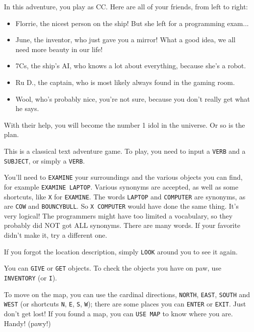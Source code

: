 \documentclass{article}
\newcommand{\bckg}[1]{\AddToShipoutPictureBG*{\texttt{[image: \#1]}}}
\begin{document}
In this adventure, you play as CC.
Here are all of your friends, from left to right:
\begin{itemize}
    \item Florrie, the nicest person on the ship! But she left for a programming exam...
    \item June, the inventor, who just gave you a mirror! What a good idea, we all need more beauty in our life!
    \item 7Cs, the ship's AI, who knows a lot about everything, because she's a robot.
    \item Ru D., the captain, who is most likely always found in the gaming room.
    \item Wool, who's probably nice, you're not sure, because you don't really get what he says.
\end{itemize}

With their help, you will become the number 1 idol in the universe. Or so is the plan.

\clearpage
{}
\bckg{img/bg}

This is a classical text adventure game.
To play, you need to input a \texttt{VERB} and a \texttt{SUBJECT}, or simply a \texttt{VERB}.

You'll need to \texttt{EXAMINE} your surroundings and the various objects you can find,
for example \texttt{EXAMINE LAPTOP}.
Various synonyms are accepted, as well as some shortcuts, like \texttt{X} for \texttt{EXAMINE}.
The words \texttt{LAPTOP} and \texttt{COMPUTER} are synonyms, as are \texttt{COW} and \texttt{BOUNCYBULL}.
So \texttt{X COMPUTER} would have done the same thing.
It's very logical!
The programmers might have too limited a vocabulary, so they probably did NOT got ALL synonyms.
There are many words. If your favorite didn't make it, try a different one.

If you forgot the location description, simply \texttt{LOOK} around you to see it again.

You can \texttt{GIVE} or \texttt{GET} objects. To check the objects you have on paw,
use \texttt{INVENTORY} (or \texttt{I}).

To move on the map, you can use the cardinal directions, \texttt{NORTH}, \texttt{EAST},
\texttt{SOUTH} and \texttt{WEST} (or shortcuts \texttt{N}, \texttt{E}, \texttt{S}, \texttt{W});
there are some places you can \texttt{ENTER} or \texttt{EXIT}.
Just don't get lost! If you found a map, you can \texttt{USE MAP} to know where you are.
Handy! (pawy!)
\end{document}
